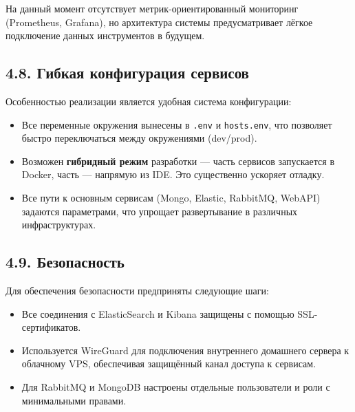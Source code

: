На данный момент отсутствует метрик-ориентированный мониторинг
(Prometheus, Grafana), но архитектура системы предусматривает лёгкое
подключение данных инструментов в будущем.

\hypertarget{ux433ux438ux431ux43aux430ux44f-ux43aux43eux43dux444ux438ux433ux443ux440ux430ux446ux438ux44f-ux441ux435ux440ux432ux438ux441ux43eux432}{%
\subsection{4.8. Гибкая конфигурация
сервисов}\label{ux433ux438ux431ux43aux430ux44f-ux43aux43eux43dux444ux438ux433ux443ux440ux430ux446ux438ux44f-ux441ux435ux440ux432ux438ux441ux43eux432}}

Особенностью реализации является удобная система конфигурации:

\begin{itemize}
\tightlist
\item
  Все переменные окружения вынесены в \texttt{.env} и
  \texttt{hosts.env}, что позволяет быстро переключаться между
  окружениями (dev/prod).\\
\item
  Возможен \textbf{гибридный режим} разработки --- часть сервисов
  запускается в Docker, часть --- напрямую из IDE. Это существенно
  ускоряет отладку.\\
\item
  Все пути к основным сервисам (Mongo, Elastic, RabbitMQ, WebAPI)
  задаются параметрами, что упрощает развертывание в различных
  инфраструктурах.
\end{itemize}

\hypertarget{ux431ux435ux437ux43eux43fux430ux441ux43dux43eux441ux442ux44c}{%
\subsection{4.9.
Безопасность}\label{ux431ux435ux437ux43eux43fux430ux441ux43dux43eux441ux442ux44c}}

Для обеспечения безопасности предприняты следующие шаги:

\begin{itemize}
\tightlist
\item
  Все соединения с ElasticSearch и Kibana защищены с помощью
  SSL-сертификатов.\\
\item
  Используется WireGuard для подключения внутреннего домашнего сервера к
  облачному VPS, обеспечивая защищённый канал доступа к сервисам.\\
\item
  Для RabbitMQ и MongoDB настроены отдельные пользователи и роли с
  минимальными правами.
\end{itemize}

